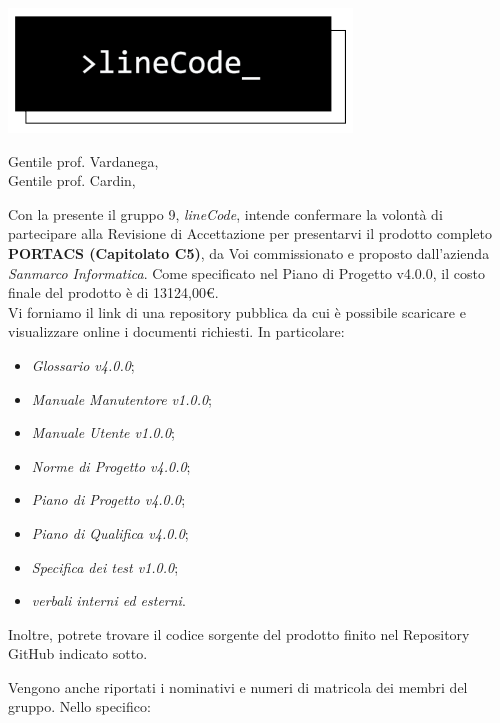 \documentclass[12pt]{letter}
\date{23 agosto 2021}
\begin{document}
\begin{letter}{ }

\includegraphics[scale=0.5]{../../commons/res/lclong.png}

\opening{Gentile prof. Vardanega,\\ Gentile prof. Cardin, }

Con la presente il gruppo 9, \textit{lineCode}, intende confermare la volontà di partecipare alla Revisione di Accettazione per presentarvi il prodotto completo \textbf{PORTACS (Capitolato C5)}, da Voi commissionato e proposto dall'azienda \textit{Sanmarco Informatica}. Come specificato nel Piano di Progetto v4.0.0, il costo finale del prodotto è di 13124,00\euro. \\

Vi forniamo il link di una repository pubblica da cui è possibile scaricare e visualizzare online i documenti richiesti. In particolare:

\begin{itemize}
	\item \textit{Glossario v4.0.0};
	\item \textit{Manuale Manutentore v1.0.0};
	\item \textit{Manuale Utente v1.0.0};
	\item \textit{Norme di Progetto v4.0.0};
	\item \textit{Piano di Progetto v4.0.0};
	\item \textit{Piano di Qualifica v4.0.0};
	\item \textit{Specifica dei test v1.0.0};	
	\item \textit{verbali interni ed esterni}.
\end{itemize}
Inoltre, potrete trovare il codice sorgente del prodotto finito nel Repository GitHub indicato sotto.

\newpage

Vengono anche riportati i nominativi e numeri di matricola dei membri del gruppo. Nello specifico:


\end{letter}
\end{document}
